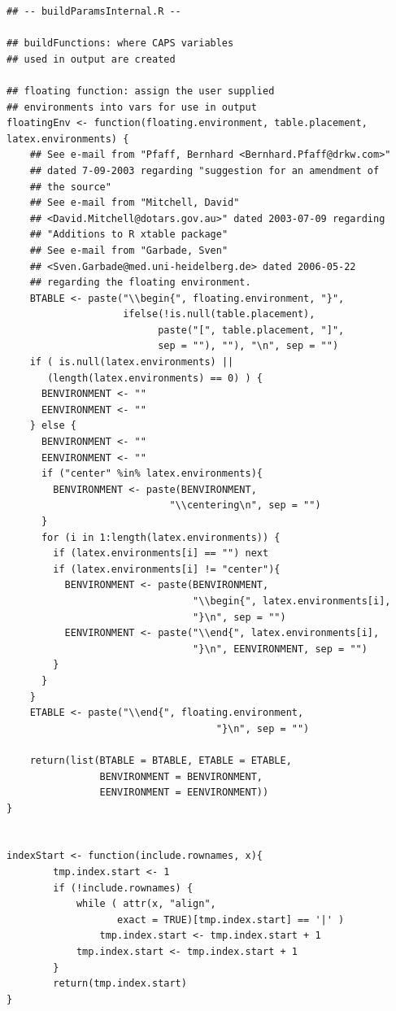 \documentclass{memoir}\usepackage[]{graphicx}\usepackage[]{color}
\begin{document}
\begin{lstlisting}
## -- buildParamsInternal.R --

## buildFunctions: where CAPS variables 
## used in output are created

## floating function: assign the user supplied 
## environments into vars for use in output
floatingEnv <- function(floating.environment, table.placement, latex.environments) {
    ## See e-mail from "Pfaff, Bernhard <Bernhard.Pfaff@drkw.com>"
    ## dated 7-09-2003 regarding "suggestion for an amendment of
    ## the source"
    ## See e-mail from "Mitchell, David"
    ## <David.Mitchell@dotars.gov.au>" dated 2003-07-09 regarding
    ## "Additions to R xtable package"
    ## See e-mail from "Garbade, Sven"
    ## <Sven.Garbade@med.uni-heidelberg.de> dated 2006-05-22
    ## regarding the floating environment.
    BTABLE <- paste("\\begin{", floating.environment, "}",
                    ifelse(!is.null(table.placement),
                          paste("[", table.placement, "]", 
                          sep = ""), ""), "\n", sep = "")
    if ( is.null(latex.environments) || 
       (length(latex.environments) == 0) ) {
      BENVIRONMENT <- ""
      EENVIRONMENT <- ""
    } else {
      BENVIRONMENT <- ""
      EENVIRONMENT <- ""
      if ("center" %in% latex.environments){
        BENVIRONMENT <- paste(BENVIRONMENT, 
                            "\\centering\n", sep = "")
      }
      for (i in 1:length(latex.environments)) {
        if (latex.environments[i] == "") next
        if (latex.environments[i] != "center"){
          BENVIRONMENT <- paste(BENVIRONMENT,
                                "\\begin{", latex.environments[i],
                                "}\n", sep = "")
          EENVIRONMENT <- paste("\\end{", latex.environments[i],
                                "}\n", EENVIRONMENT, sep = "")
        }
      }
    }
    ETABLE <- paste("\\end{", floating.environment, 
                                    "}\n", sep = "")
    
    return(list(BTABLE = BTABLE, ETABLE = ETABLE, 
                BENVIRONMENT = BENVIRONMENT, 
                EENVIRONMENT = EENVIRONMENT))
}


indexStart <- function(include.rownames, x){
        tmp.index.start <- 1
        if (!include.rownames) {
            while ( attr(x, "align", 
                   exact = TRUE)[tmp.index.start] == '|' )
                tmp.index.start <- tmp.index.start + 1
            tmp.index.start <- tmp.index.start + 1
        }
        return(tmp.index.start)
}


\end{lstlisting}
\end{document}
